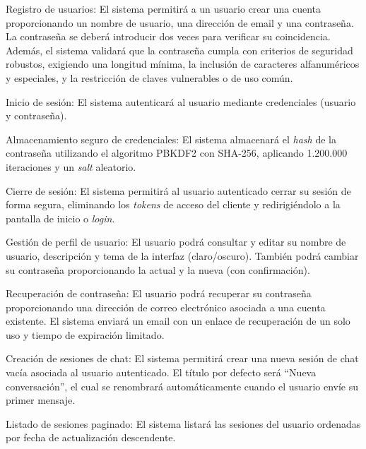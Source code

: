 \begin{functional}
    \item[RF-01.-] Registro de usuarios: El sistema permitirá a un usuario crear una cuenta proporcionando un nombre de usuario, una dirección de email y una contraseña. La contraseña se deberá introducir dos veces para verificar su coincidencia. Además, el sistema validará que la contraseña cumpla con criterios de seguridad robustos, exigiendo una longitud mínima, la inclusión de caracteres alfanuméricos y especiales, y la restricción de claves vulnerables o de uso común.

    \item[RF-02.-] Inicio de sesión: El sistema autenticará al usuario mediante credenciales (usuario y contraseña).

    \item[RF-03.-] Almacenamiento seguro de credenciales: El sistema almacenará el \textit{hash} de la contraseña utilizando el algoritmo PBKDF2 con SHA-256, aplicando 1.200.000 iteraciones y un \textit{salt} aleatorio.

    \item[RF-04.-] Cierre de sesión: El sistema permitirá al usuario autenticado cerrar su sesión de forma segura, eliminando los \textit{tokens} de acceso del cliente y redirigiéndolo a la pantalla de inicio o \textit{login}.

    \item[RF-05.-] Gestión de perfil de usuario: El usuario podrá consultar y editar su nombre de usuario, descripción y tema de la interfaz (claro/oscuro). También podrá cambiar su contraseña proporcionando la actual y la nueva (con confirmación).

    \item[RF-06.-] Recuperación de contraseña: El usuario podrá recuperar su contraseña proporcionando una dirección de correo electrónico asociada a una cuenta existente. El sistema enviará un email con un enlace de recuperación de un solo uso y tiempo de expiración limitado.

    \item[RF-07.-] Creación de sesiones de chat: El sistema permitirá crear una nueva sesión de chat vacía asociada al usuario autenticado. El título por defecto será ``Nueva conversación'', el cual se renombrará automáticamente cuando el usuario envíe su primer mensaje.

    \item[RF-08.-] Listado de sesiones paginado: El sistema listará las sesiones del usuario ordenadas por fecha de actualización descendente.


\end{functional}
